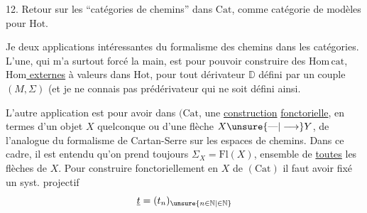 12. Retour sur les ``catégories de chemins'' dans $\mathrm{Cat}$, comme
catégorie de modèles pour $\mathrm{Hot}$.

Je   deux applications intéressantes
du formalisme des chemins dans les catégories.
L'une, qui m'a surtout forcé la main, est
pour pouvoir construire des $\mathrm{Hom}\,\mathrm{cat}$, \uline{$\mathrm{Hom}$
externes} à valeurs dans $\mathrm{Hot}$, pour tout dérivateur
$\mathbb D$ défini par un couple $(M,\Sigma)$ (et je
ne connais pas  prédérivateur qui ne
soit défini ainsi.

L'autre application est pour avoir dans $(\mathrm{Cat}$,
une \uline{construction} \uline{fonctorielle}, en termes
d'un objet $X$ quelconque ou d'une 
flèche $X\unsure{\text{---}|\longrightarrow}Y$, de l'analogue du formalisme
de Cartan-Serre sur les espaces de
chemins. Dans ce cadre, il est entendu
qu'on prend toujours $\Sigma_X=\mathrm{Fl}(X)$, ensemble de
\uline{toutes} les flèches de $X$. Pour construire
fonctoriellement en $X$ de $(\mathrm{Cat})$
il faut avoir fixé un syst. projectif
\[
\underline t=(t_n)_{\unsure{n\in\mathbb N|\in\mathbb N}}
\]
